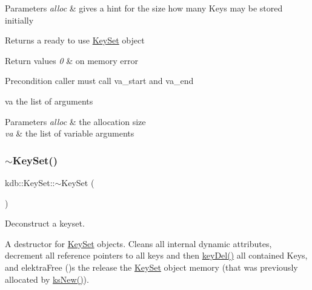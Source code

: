 \begin{DoxyParams}{Parameters}
{\em alloc} & gives a hint for the size how many Keys may be stored initially \\
\hline
\end{DoxyParams}
\begin{DoxyReturn}{Returns}
a ready to use \hyperlink{classkdb_1_1KeySet}{Key\+Set} object 
\end{DoxyReturn}

\begin{DoxyRetVals}{Return values}
{\em 0} & on memory error\\
\hline
\end{DoxyRetVals}
\begin{DoxyPrecond}{Precondition}
caller must call va\+\_\+start and va\+\_\+end 
\end{DoxyPrecond}
\begin{DoxyParagraph}{va the list of arguments}

\end{DoxyParagraph}

\begin{DoxyParams}{Parameters}
{\em alloc} & the allocation size \\
\hline
{\em va} & the list of variable arguments \\
\hline
\end{DoxyParams}
\mbox{\label{classkdb_1_1KeySet_ade654f92bddec24abad1b651e828f2b8}} 
\subsubsection{\texorpdfstring{$\sim$\+Key\+Set()}{~KeySet()}}
{\footnotesize\ttfamily kdb\+::\+Key\+Set\+::$\sim$\+Key\+Set (\begin{DoxyParamCaption}{ }\end{DoxyParamCaption})\hspace{0.3cm}{\ttfamily [inline]}}



Deconstruct a keyset. 

A destructor for \hyperlink{classkdb_1_1KeySet}{Key\+Set} objects. Cleans all internal dynamic attributes, decrement all reference pointers to all keys and then \hyperlink{group__key_ga3df95bbc2494e3e6703ece5639be5bb1}{key\+Del()} all contained Keys, and elektra\+Free ()s the release the \hyperlink{classkdb_1_1KeySet}{Key\+Set} object memory (that was previously allocated by \hyperlink{group__keyset_ga671e1aaee3ae9dc13b4834a4ddbd2c3c}{ks\+New()}).


